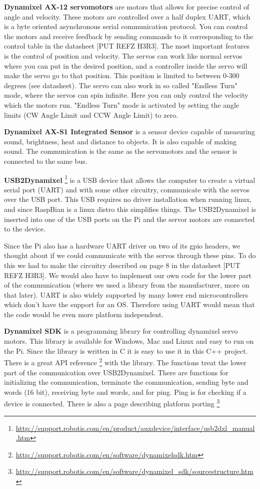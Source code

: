 \textbf{Dynamixel AX-12 servomotors}
are motors that allows for precise control of angle and velocity. These motors are controlled over a half duplex UART, which is a byte oriented asynchronous serial communication protocol. You can control the motors and receive feedback by sending commands to it corresponding to the control table in the datasheet [PUT REFZ H3R3]. The most important features is the control of position and velocity. The servos can work like normal servos where you can put in the desired position, and a controller inside the servo will make the servo go to that position. This position is limited to between 0-300 degrees (see datasheet). The servo can also work in so called "Endless Turn" mode, where the servos can spin infinite. Here you can only control the velocity which the motors run. "Endless Turn" mode is activated by setting the angle limits (CW Angle Limit and CCW Angle Limit) to zero.
\bigskip

\textbf{Dynamixel AX-S1 Integrated Sensor}
is a sensor device capable of measuring sound, brightness, heat and distance to objects. It is also capable of making sound. The communication is the same as the servomotors and the sensor is connected to the same bus. 
\bigskip

\textbf{USB2Dynamixel} \footnote{\url{http://support.robotis.com/en/product/auxdevice/interface/usb2dxl_manual.htm}} is a USB device that allows the computer to create a virtual serial port (UART) and with some other circuitry, communicate with the servos over the USB port.
This USB requires no driver installation when running linux, and since RaspBian is a linux distro this simplifies things. 
The USB2Dynamixel is inserted into one of the USB ports on the Pi and the servor motors are connected to the device.

Since the Pi also has a hardware UART driver on two of its gpio headers, we thought about if we could communicate with the servos through these pins. 
To do this we had to make the circuitry described on page 8 in the datasheet [PUT REFZ H3R3]. 
We would also have to implement our own code for the lower part of the communication (where we used a library from the manufacturer, more on that later).
UART is also widely supported by many lower end microcontrollers which don't have the support for an OS. 
Therefore using UART would mean that the code would be even more platform independent.
\bigskip

\textbf{Dynamixel SDK} is a programming library for controlling dynamixel servo motors. 
This library is available for Windows, Mac and Linux and easy to run on the Pi. 
Since the library is written in C it is easy to use it in this C++ project.
There is a great API reference \footnote{\url{http://support.robotis.com/en/software/dynamixelsdk.htm}} with the library.
The functions treat the lower part of the communication over USB2Dynamixel.
There are functions for initializing the communication, terminate the communication, sending byte and words (16 bit), receiving byte and words, and for ping. Ping is for checking if a device is connected.
There is also a page describing platform porting \footnote{\url{http://support.robotis.com/en/software/dynamixel_sdk/sourcestructure.htm}}


